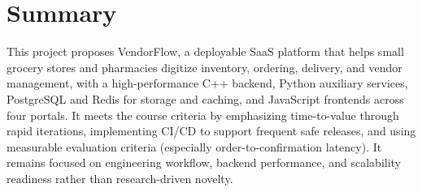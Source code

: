 \documentclass{article}
\begin{document}
\section{Summary}
This project proposes VendorFlow, a deployable SaaS platform that helps small grocery stores
and pharmacies digitize inventory, ordering, delivery, and vendor management, with a
high-performance C++ backend, Python auxiliary services, PostgreSQL and Redis for storage and
caching, and JavaScript frontends across four portals. It meets the course criteria by
emphasizing time-to-value through rapid iterations, implementing CI/CD to support frequent safe
releases, and using measurable evaluation criteria (especially order-to-confirmation latency).
It remains focused on engineering workflow, backend performance, and scalability readiness
rather than research-driven novelty.
\end{document}
